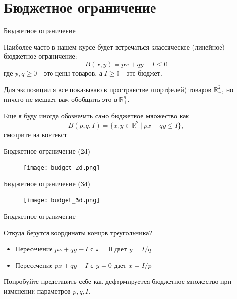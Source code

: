 \documentclass{beamer}
\begin{document}
\section{Бюджетное ограничение}

\begin{frame}{Бюджетное ограничение}

Наиболее часто в нашем курсе будет встречаться классическое (линейное) \alert{бюджетное ограничение}:
$$ B(x,y) = p x + q y - I \leqslant 0$$
где $p, q \geqslant 0$ - это цены товаров, а $I \geqslant 0$ - это бюджет. 

Для экспозиции я все показываю в пространстве (портфелей) товаров $\mathbb{R}^2_+$, но ничего не мешает вам обобщить это в $\mathbb{R}^n_+$. 

Еще я буду иногда обозначать само \alert{бюджетное множество} как $$B(p,q,I)=\{x,y \in \mathbb{R}^2_{+}| \ px + qy \leqslant I\},$$ смотрите на контекст.

\end{frame}

\begin{frame}{Бюджетное ограничение (2d)}

\begin{figure}[hbt]
\centering
\texttt{[image: budget\_2d.png]}
\end{figure}

\end{frame}

\begin{frame}{Бюджетное ограничение (3d)}

\begin{figure}[hbt]
\centering
\texttt{[image: budget\_3d.png]}
\end{figure}

\end{frame}

\begin{frame}{Бюджетное ограничение}

Откуда берутся координаты концов треугольника?

\begin{itemize}
  \item Пересечение $p x + q y - I$ с $x=0$ дает $y = I/q$
  \item Пересечение $p x + q y - I$ с $y=0$ дает $x = I/p$
\end{itemize}

Попробуйте представить себе как деформируется бюджетное множество при изменении параметров $p,q,I$.

\end{frame}
\end{document}
